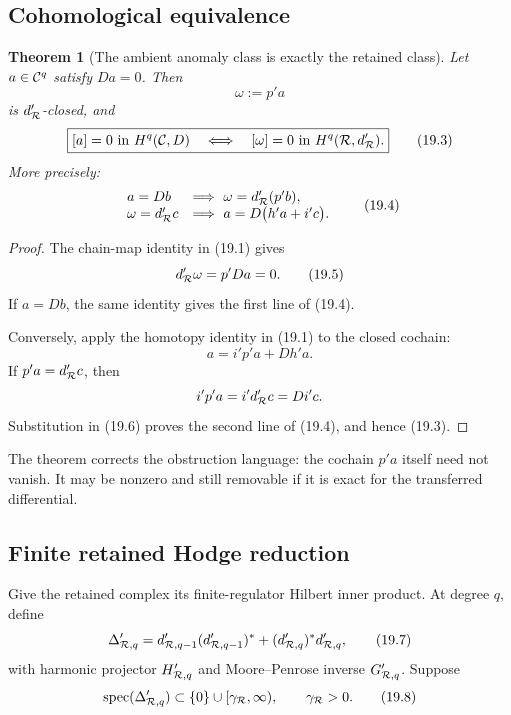 \documentclass[11pt]{article}
\newtheorem{theorem}{Theorem}[section]
\theoremstyle{remark}
\begin{document}
\subsection{Cohomological equivalence}

\begin{theorem}[The ambient anomaly class is exactly the retained
class]
\label{thm:v12v19-equivalence}
Let \(a\in{\cal C}^q\) satisfy \(Da=0\).  Then
\[
                         \omega:=p'a                       \tag{19.2}
\]
is \(d_{\cal R}'\)-closed, and
\[
 \boxed{
 [a]=0\text{ in }H^q({\cal C},D)
 \quad\Longleftrightarrow\quad
 [\omega]=0\text{ in }H^q({\cal R},d_{\cal R}').}           \tag{19.3}
\]
More precisely:
\[
\begin{array}{ll}
a=Db&\Longrightarrow\ \omega=d_{\cal R}'(p'b),\\
\omega=d_{\cal R}'c&
\Longrightarrow\
a=D\bigl(h'a+i'c\bigr).
\end{array}                                                  \tag{19.4}
\]
\end{theorem}

\begin{proof}
The chain-map identity in (19.1) gives
\[
                 d_{\cal R}'\omega=p'Da=0.                 \tag{19.5}
\]
If \(a=Db\), the same identity gives the first line of (19.4).

Conversely, apply the homotopy identity in (19.1) to the closed
cochain:
\[
                         a=i'p'a+D h'a.                     \tag{19.6}
\]
If \(p'a=d_{\cal R}'c\), then
\[
 i'p'a=i'd_{\cal R}'c=D i'c.
\]
Substitution in (19.6) proves the second line of (19.4), and hence
(19.3).
\end{proof}

The theorem corrects the obstruction language: the cochain \(p'a\)
itself need not vanish.  It may be nonzero and still removable if it
is exact for the transferred differential.

\subsection{Finite retained Hodge reduction}

Give the retained complex its finite-regulator Hilbert inner product.
At degree \(q\), define
\[
 \Delta_{{\cal R},q}'
 =
 d_{{\cal R},q-1}'(d_{{\cal R},q-1}')^*
 +(d_{{\cal R},q}')^*d_{{\cal R},q}',                      \tag{19.7}
\]
with harmonic projector \(H_{{\cal R},q}'\) and Moore--Penrose inverse
\(G_{{\cal R},q}'\).  Suppose
\[
 \operatorname{spec}(\Delta_{{\cal R},q}')
 \subset\{0\}\cup[\gamma_{\cal R},\infty),
 \qquad \gamma_{\cal R}>0.                                 \tag{19.8}
\]
\end{document}
